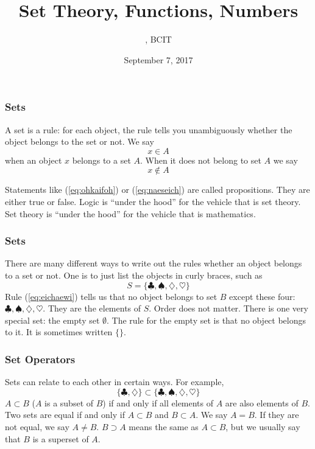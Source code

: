 \documentclass[xcolor=dvipsnames]{beamer}
\title{Set Theory, Functions, Numbers}
\subtitle{{\CourseNumber}, BCIT}
\author{\CourseName}
\date{September 7, 2017}
\begin{document}
\begin{frame}
  \titlepage
\end{frame}

\begin{frame}
  \frametitle{Sets}
  A \alert{set} is a rule: for each object, the rule tells you
  unambiguously whether the object belongs to the set or not. We say
\begin{equation}
  \label{eq:ohkaifoh}
  x\in{}A
\end{equation}
when an object $x$ belongs to a set $A$. When it does not belong to
set $A$ we say
\begin{equation}
  \label{eq:naeseich}
  x\notin{}A
\end{equation}

Statements like (\ref{eq:ohkaifoh}) or (\ref{eq:naeseich}) are called
\alert{propositions}. They are either true or false. Logic is ``under
the hood'' for the vehicle that is set theory. Set theory is ``under
the hood'' for the vehicle that is mathematics.
\end{frame}

\begin{frame}
  \frametitle{Sets}
There are many different ways to write out the rules whether an object
belongs to a set or not. One is to just list the objects in curly
braces, such as
\begin{equation}
  \label{eq:eichaewi}
  S=\{\clubsuit,\spadesuit,\diamondsuit,\heartsuit\}
\end{equation}
Rule (\ref{eq:eichaewi}) tells us that no object belongs to set $B$
except these four: $\clubsuit,\spadesuit,\diamondsuit,\heartsuit$.
They are the \alert{elements} of $S$. Order does not matter. There is
one very special set: the \alert{empty set} $\emptyset$. The rule for
the empty set is that no object belongs to it. It is sometimes written
$\{\}$.
\end{frame}

\begin{frame}
  \frametitle{Set Operators}
  Sets can relate to each other in certain ways. For example,
  \begin{equation}
    \label{eq:johbaexi}
    \{\clubsuit,\diamondsuit\}\subset\{\clubsuit,\spadesuit,\diamondsuit,\heartsuit\}
  \end{equation}
  $A\subset{}B$ ($A$ is a \alert{subset} of $B$) if and only if all
  elements of $A$ are also elements of $B$. Two sets are equal if and
  only if $A\subset{}B$ and $B\subset{}A$. We say $A=B$. If they are
  not equal, we say $A\neq{}B$. $B\supset{}A$ means the same as
  $A\subset{}B$, but we usually say that $B$ is a superset of $A$.
\end{frame}
\end{document}
